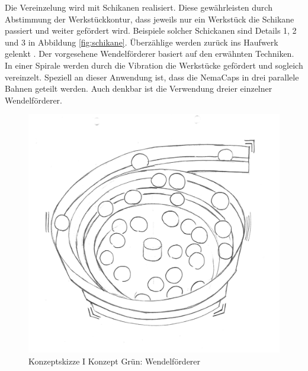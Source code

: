 \vspace{0.6cm}

Die Vereinzelung wird mit Schikanen realisiert. Diese gewährleisten durch Abstimmung der Werkstückkontur, dass jeweils nur ein Werkstück die Schikane passiert und weiter gefördert wird. Beispiele solcher Schickanen sind Details 1, 2 und 3 in Abbildung \ref{fig:schikane}. Überzählige werden zurück ins Haufwerk gelenkt \cite{handling_online}.
\newline
Der vorgesehene Wendelförderer basiert auf den erwähnten Techniken. In einer Spirale werden durch die Vibration die Werkstücke gefördert und sogleich vereinzelt. Speziell an dieser Anwendung ist, dass die NemaCaps in drei parallele Bahnen geteilt werden. Auch denkbar ist die Verwendung dreier einzelner Wendelförderer.

\begin{figure}[H]
	\includegraphics[scale=0.5]{Illustrationen/5-Konzept/green_wendelfoerderer.jpg}
	\caption{Konzeptskizze I Konzept Grün: Wendelförderer}
	\label{fig:vereinzelung_green}
\end{figure}

